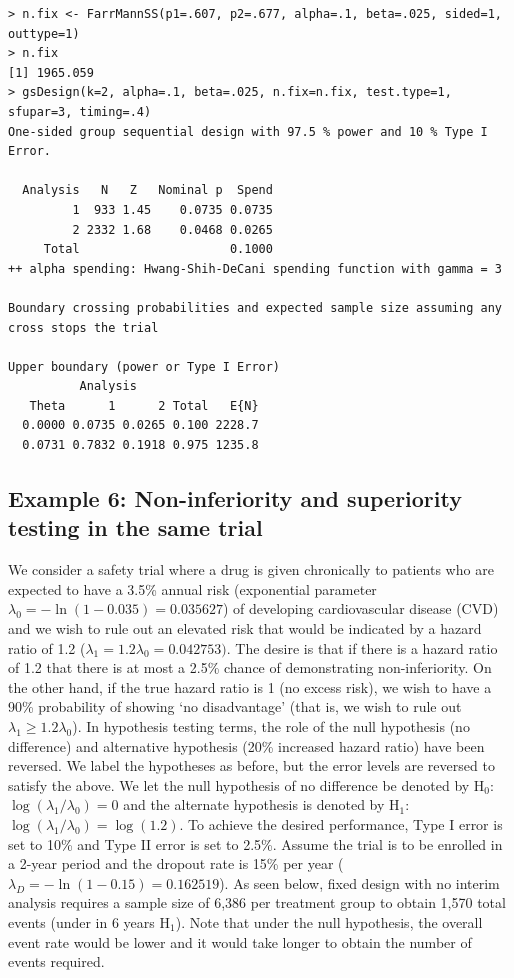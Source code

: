 \bigskip

\begin{verbatim}
> n.fix <- FarrMannSS(p1=.607, p2=.677, alpha=.1, beta=.025, sided=1, outtype=1)
> n.fix
[1] 1965.059
> gsDesign(k=2, alpha=.1, beta=.025, n.fix=n.fix, test.type=1, sfupar=3, timing=.4)
One-sided group sequential design with 97.5 % power and 10 % Type I Error.
               
  Analysis   N   Z   Nominal p  Spend
         1  933 1.45    0.0735 0.0735
         2 2332 1.68    0.0468 0.0265
     Total                     0.1000 
++ alpha spending: Hwang-Shih-DeCani spending function with gamma = 3

Boundary crossing probabilities and expected sample size assuming any cross stops the trial

Upper boundary (power or Type I Error)
          Analysis
   Theta      1      2 Total   E{N}
  0.0000 0.0735 0.0265 0.100 2228.7
  0.0731 0.7832 0.1918 0.975 1235.8
\end{verbatim}

\subsection*{Example 6: Non-inferiority and superiority testing in the same trial }


We consider a safety trial where a drug is given chronically to patients who
are expected to have a 3.5\% annual risk (exponential parameter $\lambda
_{0}=-\ln(1-0.035)=0.035627$) of developing cardiovascular disease (CVD) and
we wish to rule out an elevated risk that would be indicated by a hazard ratio
of 1.2 ($\lambda_{1}=1.2\lambda_{0}=0.042753)$. The desire is that if there is
a hazard ratio of 1.2 that there is at most a 2.5\% chance of demonstrating
non-inferiority. On the other hand, if the true hazard ratio is 1 (no excess
risk), we wish to have a 90\% probability of showing `no disadvantage'
(that is, we wish to rule out $\lambda_{1}\geq1.2\lambda_{0}$). In
hypothesis testing terms, the role of the null hypothesis (no difference) and
alternative hypothesis (20\% increased hazard ratio) have been reversed. We
label the hypotheses as before, but the error levels are reversed to
satisfy the above. We let the null hypothesis of no difference be denoted by
H$_{0}$: $\log(\lambda_{1}/\lambda_{0})=0$ and the alternate hypothesis is denoted by H$_{1}$: $\log(\lambda_{1}/\lambda_{0})=\log(1.2).$ To achieve
the desired performance, Type I error is set to 10\% and Type II error is set
to 2.5\%. Assume the trial is to be enrolled in a 2-year period and the
dropout rate is 15\% per year ($\lambda_{D}=-\ln(1-0.15)=0.162519$). As seen
below, fixed design with no interim analysis requires a sample size of 6,386
per treatment group to obtain 1,570 total events (under in 6 years H$_{1}$).
Note that under the null hypothesis, the overall event rate would be lower and
it would take longer to obtain the number of events required.

